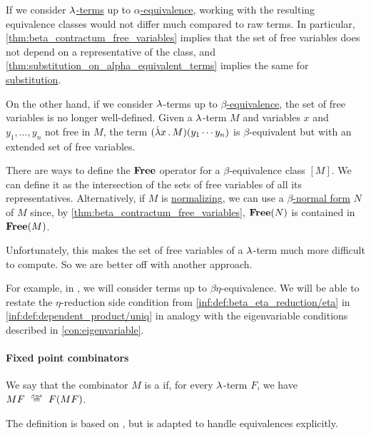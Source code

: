 \begin{remark}\label{rem:beta_equivalence_and_free_variables}
  If we consider \hyperref[def:lambda_term]{\( {\mathrm \lambda} \)-terms} up to \hyperref[def:lambda_term_alpha_equivalence]{\( \alpha \)-equivalence}, working with the resulting equivalence classes would not differ much compared to raw terms. In particular, \cref{thm:beta_contractum_free_variables} implies that the set of free variables does not depend on a representative of the class, and \cref{thm:substitution_on_alpha_equivalent_terms} implies the same for \hyperref[def:lambda_term_substitution]{substitution}.

  On the other hand, if we consider \( {\mathrm \lambda} \)-terms up to \hyperref[def:beta_eta_reduction]{\( \beta \)-equivalence}, the set of free variables is no longer well-defined. Given a \( {\mathrm \lambda} \)-term \( M \) and variables \( x \) and \( y_1, \ldots, y_n \) not free in \( M \), the term \( (\qabs x M) (y_1 \cdots y_n) \) is \( \beta \)-equivalent but with an extended set of free variables.

  There are ways to define the \( \op*{Free} \) operator for a \( \beta \)-equivalence class \( [M] \). We can define it as the intersection of the sets of free variables of all its representatives. Alternatively, if \( M \) is \hyperref[def:lambda_term_normal_form]{normalizing}, we can use a \hyperref[def:lambda_term_normal_form]{\( \beta \)-normal form} \( N \) of \( M \) since, by \cref{thm:beta_contractum_free_variables}, \( \op*{Free}(N) \) is contained in \( \op*{Free}(M) \).

  Unfortunately, this makes the set of free variables of a \( {\mathrm \lambda} \)-term much more difficult to compute. So we are better off with another approach.

  For example, in , we will consider terms up to \( \beta\eta \)-equivalence. We will be able to restate the \( \eta \)-reduction side condition from \ref{inf:def:beta_eta_reduction/eta} in \ref{inf:def:dependent_product/uniq} in analogy with the eigenvariable conditions described in \cref{con:eigenvariable}.
\end{remark}

\paragraph{Fixed point combinators}

\begin{definition}\label{def:function_fixed_point_combinator}\mimprovised
  We say that the combinator \( M \) is a  if, for every \( {\mathrm \lambda} \)-term \( F \), we have \( MF \equivrel{\beta\eta\delta} F(MF) \).
\end{definition}
\begin{comments}
  \item The definition is based on \cite[\S 6.1.2]{Barendregt1984LambdaCalculus}, but is adapted to handle equivalences explicitly.
\end{comments}

